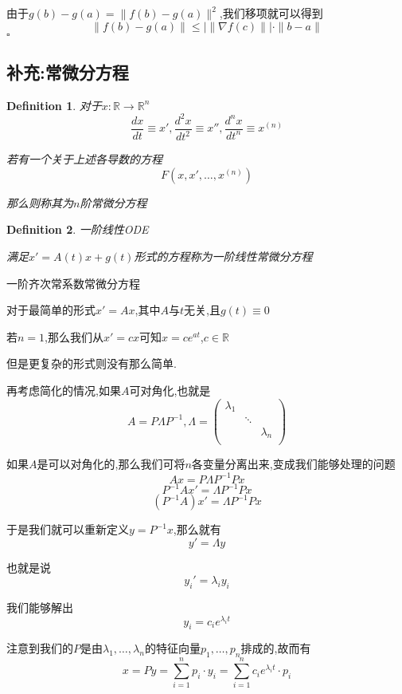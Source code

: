 \documentclass[11pt,hyperref,a4paper,UTF8]{ctexart}
\newtheorem{definition}{Definition}[subsection]
\newenvironment{cproof}{%
\heiti{证明}\kaishu
}{%
  \hfill $\square$
  \par\bigskip
}
\newcommand{\RR}{\mathbb{R}}
\begin{document}
\begin{CJK}{UTF8}{gkai}
\begin{cproof}
  由于$g(b) -g(a) = \|f(b) - g(a)\|^2$,我们移项就可以得到
  \[\|f(b) - g(a)\| \leq |\| \nabla f(c)\||\cdot \|b - a\|\]
\end{cproof}

\subsection*{补充:常微分方程}

\begin{definition}
  对于$x: \RR \to \RR^n$
  \[\frac{dx}{dt} \equiv x',\frac{d^2x}{dt^2} \equiv x'',\frac{d^n x}{dt^n} \equiv x^{(n)}\]

  若有一个关于上述各导数的方程
  \[F(x,x',\ldots,x^{(n)})\]

  那么则称其为$n$阶常微分方程
\end{definition}

\begin{definition}
  一阶线性ODE

  满足$x' = A(t) x + g(t)$形式的方程称为一阶线性常微分方程
\end{definition}

一阶齐次常系数常微分方程

对于最简单的形式$x' = Ax$,其中$A$与$t$无关,且$g(t) \equiv 0$

若$n = 1$,那么我们从$x' = cx$可知$x = c e^{at}$,$c \in \RR$

但是更复杂的形式则没有那么简单.

再考虑简化的情况,如果$A$可对角化,也就是
\[A = P \varLambda P^{-1}, \varLambda = \begin{pmatrix}
  \lambda_1&&\\
  &\ddots&\\
  &&\lambda_n\\
\end{pmatrix}\]

如果$A$是可以对角化的,那么我们可将$n$各变量分离出来,变成我们能够处理的问题
\[Ax = P \varLambda P^{-1} P x\]
\[P^{-1} Ax' = \varLambda P^{-1} P x\]
\[(P^{-1} A)x' = \varLambda P^{-1} P x\]

于是我们就可以重新定义$y = P^{-1} x$,那么就有
\[y' = \varLambda y\]

也就是说
\[y_i' = \lambda_i y_i\]

我们能够解出
\[y_i = c_i e^{\lambda_i t}\]

注意到我们的$P$是由$\lambda_1,\ldots,\lambda_n$的特征向量$p_1,\ldots,p_n$排成的,故而有
\[x  = Py = \sum_{i = 1}^{n} p_i\cdot y_i = \sum_{i = 1}^{n} c_i e^{\lambda_i t} \cdot p_i\]


\end{CJK}
\end{document}

